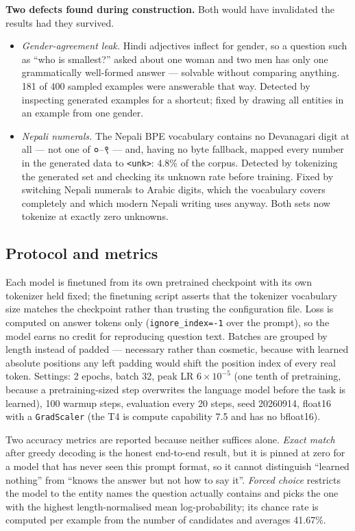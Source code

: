 \documentclass[10pt]{article}
\newcommand{\dn}[1]{{\devanagarifont #1}}
\begin{document}
\textbf{Two defects found during construction.} Both would have invalidated the
results had they survived.
\begin{itemize}
\item \emph{Gender-agreement leak.} Hindi adjectives inflect for gender, so a question
such as ``who is smallest?'' asked about one woman and two men has only one
grammatically well-formed answer --- solvable without comparing anything. 181 of 400
sampled examples were answerable that way. Detected by inspecting generated examples
for a shortcut; fixed by drawing all entities in an example from one gender.
\item \emph{Nepali numerals.} The Nepali BPE vocabulary
contains no Devanagari digit at all --- not one of \dn{०--९} --- and, having no byte
fallback, mapped every number in the generated data to \texttt{<unk>}: 4.8\% of the
corpus. Detected by tokenizing the generated set and checking its unknown rate before
training. Fixed by switching Nepali numerals to Arabic digits, which the vocabulary
covers completely and which modern Nepali writing uses anyway. Both sets now tokenize
at exactly zero unknowns.
\end{itemize}

\subsection{Protocol and metrics}

Each model is finetuned from its own pretrained checkpoint with its own tokenizer
held fixed; the finetuning script asserts that the tokenizer vocabulary size matches
the checkpoint rather than trusting the configuration file. Loss is computed on answer
tokens only (\texttt{ignore\_index=-1} over the prompt), so the model earns no credit
for reproducing question text. Batches are grouped by length instead of padded ---
necessary rather than cosmetic, because with learned absolute positions any left
padding would shift the position index of every real token. Settings: 2 epochs,
batch 32, peak LR $6{\times}10^{-5}$ (one tenth of pretraining, because a
pretraining-sized step overwrites the language model before the task is learned),
100 warmup steps, evaluation every 20 steps, seed 20260914, float16 with a
\texttt{GradScaler} (the T4 is compute capability 7.5 and has no bfloat16).

Two accuracy metrics are reported because neither suffices alone. \emph{Exact match}
after greedy decoding is the honest end-to-end result, but it is pinned at zero for a
model that has never seen this prompt format, so it cannot distinguish ``learned
nothing'' from ``knows the answer but not how to say it''. \emph{Forced choice}
restricts the model to the entity names the question actually contains and picks the
one with the highest length-normalised mean log-probability; its chance rate is
computed per example from the number of candidates and averages 41.67\%.
\end{document}
